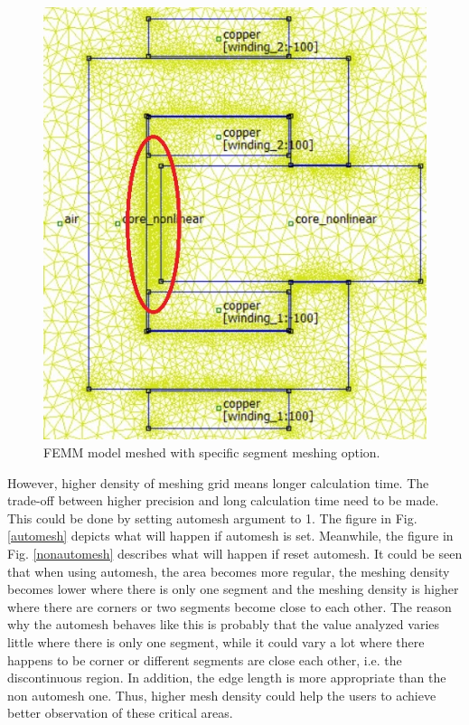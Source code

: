 \documentclass[a4paper]{IEEEtran}
\begin{document}
{\begin{figure}[!ht]
\begin{centering}
\includegraphics[scale=0.5]{mesh_with_segment_meshing.jpg} 
\par\end{centering}   
\caption{FEMM model meshed with specific segment meshing option.\label{with meshing}}
\end{figure} 

However, higher density of meshing grid means longer calculation time. The trade-off between higher precision and long calculation time 
need to be made. This could be done by setting automesh argument to 1. The figure in Fig. \ref{automesh} depicts what will happen if automesh is set. Meanwhile, the figure in Fig. \ref{nonautomesh}
describes what will happen if reset automesh.
It could be seen that when using automesh, the area becomes more regular, the meshing density becomes lower where there is only one segment and the meshing density is 
higher where there are corners or two segments become close to each other. The reason why the automesh behaves like this is probably that the value analyzed varies
little where there is only one segment, while it could vary a lot where there happens to be corner or different segments are close each other, i.e. the 
discontinuous region. In addition, the edge length is more appropriate than the non automesh one. 
Thus, higher mesh density could help the users to achieve better observation of these critical areas.

}
\end{document}
